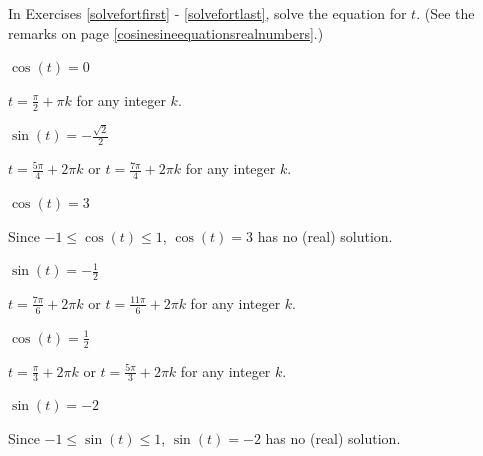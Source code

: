 \documentclass{ximera}
\begin{document}
\begin{question}
    
In Exercises \ref{solvefortfirst} - \ref{solvefortlast}, solve the equation for $t$.  (See the remarks on page \ref{cosinesineequationsrealnumbers}.)


\begin{problem}\label{solvefortfirst}
    $\cos(t) = 0$

\begin{solution}
$t = \frac{\pi}{2} + \pi k$ for any integer $k$.
\end{solution}
\end{problem}

\begin{problem}
$\sin(t) = -\frac{\sqrt{2}}{2}$

\begin{solution}
$t = \frac{5\pi}{4} + 2\pi k$ or $t = \frac{7\pi}{4} + 2\pi k$ for any integer $k$.
\end{solution}

\end{problem}

\begin{problem}
$\cos(t) = 3$

\begin{solution}

Since $-1 \leq \cos(t) \leq 1$, $\cos(t) = 3$ has no (real) solution.

\end{solution}
\end{problem}

\begin{problem}
$\sin(t) = -\frac{1}{2}$

\begin{solution}
$t = \frac{7\pi}{6} + 2\pi k$ or $t = \frac{11\pi}{6} + 2\pi k$ for any integer $k$.
\end{solution}
\end{problem}

\begin{problem}
    $\cos(t) = \frac{1}{2}$

\begin{solution}
$t = \frac{\pi}{3} + 2\pi k$ or $t = \frac{5\pi}{3} + 2\pi k$ for any integer $k$.
\end{solution}
\end{problem}

\begin{problem}
$\sin(t) = -2$

\begin{solution}
Since $-1 \leq \sin(t) \leq 1$, $\sin(t) = -2$ has no (real) solution.
\end{solution}
\end{problem}


\end{question}
\end{document}

